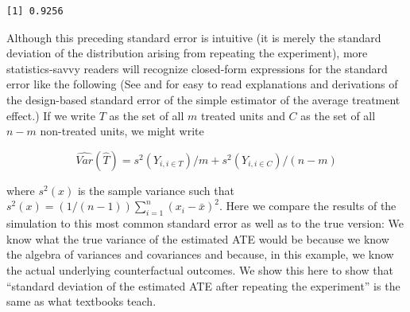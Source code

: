 \documentclass[
  12pt,
]{book}
\theoremstyle{definition}
\theoremstyle{definition}
\theoremstyle{definition}
\theoremstyle{remark}
\begin{document}
\begin{verbatim}
[1] 0.9256
\end{verbatim}

Although this preceding standard error is intuitive (it is merely the
standard deviation of the distribution arising from repeating the
experiment), more statistics-savvy readers will recognize closed-form
expressions for the standard error like the following (See
\citet{gerber_field_2012} and \citet{dunning_natural_2012} for easy to
read explanations and derivations of the design-based standard error of
the simple estimator of the average treatment effect.) If we write \(T\)
as the set of all \(m\) treated units and \(C\) as the set of all
\(n-m\) non-treated units, we might write

\begin{equation}
\widehat{Var}(\hat{T})  =  s^2(Y_{i,i \in T})/m + s^2(Y_{i,i \in C})/(n-m)
\end{equation}

where \(s^2(x)\) is the sample variance such that
\(s^2(x) = (1/(n-1))\sum^n_{i = 1}(x_i-\bar{x})^2\). Here we compare the
results of the simulation to this most common standard error as well as
to the true version: We know what the true variance of the estimated ATE
would be because we know the algebra of variances and covariances and
because, in this example, we know the actual underlying counterfactual
outcomes. We show this here to show that ``standard deviation of the
estimated ATE after repeating the experiment'' is the same as what
textbooks teach.
\end{document}
